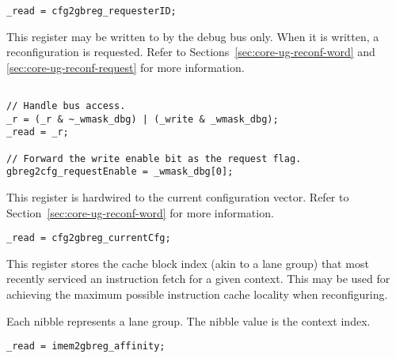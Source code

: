 \implementation{}
\begin{lstlisting}
_read = cfg2gbreg_requesterID;
\end{lstlisting}


This register may be written to by the debug bus only. When it is written, a
reconfiguration is requested. Refer to Sections~\ref{sec:core-ug-reconf-word}
and \ref{sec:core-ug-reconf-request} for more information.

\declaration{}
\implementation{}
\begin{lstlisting}

// Handle bus access.
_r = (_r & ~_wmask_dbg) | (_write & _wmask_dbg);
_read = _r;

// Forward the write enable bit as the request flag.
gbreg2cfg_requestEnable = _wmask_dbg[0];

\end{lstlisting}


This register is hardwired to the current configuration vector. Refer to
Section~\ref{sec:core-ug-reconf-word} for more information.

\implementation{}
\begin{lstlisting}
_read = cfg2gbreg_currentCfg;
\end{lstlisting}


This register stores the cache block index (akin to a lane group) that most
recently serviced an instruction fetch for a given context. This may be used for
achieving the maximum possible instruction cache locality when reconfiguring.

Each nibble represents a lane group. The nibble value is the context index.

\implementation{}
\begin{lstlisting}
_read = imem2gbreg_affinity;
\end{lstlisting}

